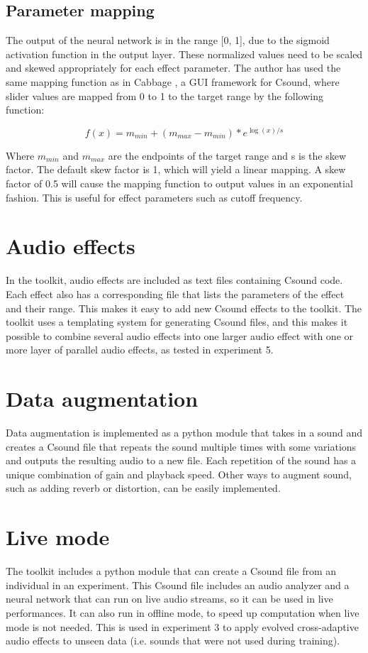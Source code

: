 \subsection{Parameter mapping}
The output of the neural network is in the range [0, 1], due to the sigmoid activation function in the output layer. These normalized values need to be scaled and skewed appropriately for each effect parameter. The author has used the same mapping function as in Cabbage \citep{walsh2008}, a GUI framework for Csound, where slider values are mapped from 0 to 1 to the target range by the following function:

$$f(x)=m_{min}+(m_{max}-m_{min})*e^{\log(x)/s}$$

Where $m_{min}$ and $m_{max}$ are the endpoints of the target range and s is the skew factor. The default skew factor is 1, which will yield a linear mapping. A skew factor of 0.5 will cause the mapping function to output values in an exponential fashion. This is useful for effect parameters such as cutoff frequency.

\section{Audio effects}
In the toolkit, audio effects are included as text files containing Csound code. Each effect also has a corresponding file that lists the parameters of the effect and their range. This makes it easy to add new Csound effects to the toolkit. The toolkit uses a templating system for generating Csound files, and this makes it possible to combine several audio effects into one larger audio effect with one or more layer of parallel audio effects, as tested in experiment 5.

\section{Data augmentation}
Data augmentation is implemented as a python module that takes in a sound and creates a Csound file that repeats the sound multiple times with some variations and outputs the resulting audio to a new file. Each repetition of the sound has a unique combination of gain and playback speed. Other ways to augment sound, such as adding reverb or distortion, can be easily implemented.

\section{Live mode}
The toolkit includes a python module that can create a Csound file from an individual in an experiment. This Csound file includes an audio analyzer and a neural network that can run on live audio streams, so it can be used in live performances. It can also run in offline mode, to speed up computation when live mode is not needed. This is used in experiment 3 to apply evolved cross-adaptive audio effects to unseen data (i.e. sounds that were not used during training).

